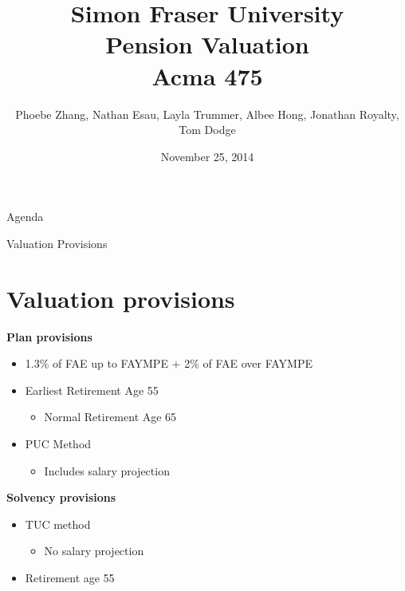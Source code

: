 \documentclass{beamer}
\title{Simon Fraser University \\ Pension Valuation \\ 
Acma 475}
\author{Phoebe Zhang, Nathan Esau, Layla Trummer, Albee Hong, Jonathan Royalty, Tom Dodge}
\date{November 25, 2014}
\begin{document}
\begin{frame}
\titlepage
\end{frame}

\begin{frame}{Agenda}
\tableofcontents
\end{frame}

\begin{frame}{Valuation Provisions}

\section{Valuation provisions}

\textbf{Plan provisions}
\begin{itemize}
\item 1.3\% of FAE up to FAYMPE + 2\% of FAE over FAYMPE
\item Earliest Retirement Age 55
\begin{itemize}
\item Normal Retirement Age 65
\end{itemize}
\item PUC Method
\begin{itemize}
\item Includes salary projection
\end{itemize}
\end{itemize}

\textbf{Solvency provisions}

\begin{itemize}
\item TUC method
\begin{itemize}
\item No salary projection
\end{itemize}
\item Retirement age 55
\end{itemize}

\end{frame}
\end{document}
